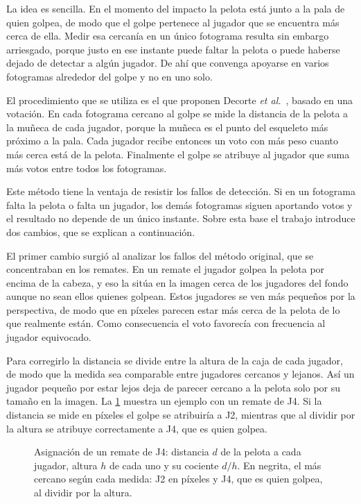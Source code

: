 La idea es sencilla. En el momento del impacto la pelota está junto a la pala de quien golpea, de modo que el golpe pertenece al jugador que se encuentra más cerca de ella.
Medir esa cercanía en un único fotograma resulta sin embargo arriesgado, porque justo en ese instante puede faltar la pelota o puede haberse dejado de detectar a algún jugador.
De ahí que convenga apoyarse en varios fotogramas alrededor del golpe y no en uno solo.

El procedimiento que se utiliza es el que proponen Decorte \textit{et al.}~\cite{decorte2024padel}, basado en una votación.
En cada fotograma cercano al golpe se mide la distancia de la pelota a la muñeca de cada jugador, porque la muñeca es el punto del esqueleto más próximo a la pala.
Cada jugador recibe entonces un voto con más peso cuanto más cerca está de la pelota.
Finalmente el golpe se atribuye al jugador que suma más votos entre todos los fotogramas.

Este método tiene la ventaja de resistir los fallos de detección.
Si en un fotograma falta la pelota o falta un jugador, los demás fotogramas siguen aportando votos y el resultado no depende de un único instante.
Sobre esta base el trabajo introduce dos cambios, que se explican a continuación.

El primer cambio surgió al analizar los fallos del método original, que se concentraban en los remates.
En un remate el jugador golpea la pelota por encima de la cabeza, y eso la sitúa en la imagen cerca de los jugadores del fondo aunque no sean ellos quienes golpean.
Estos jugadores se ven más pequeños por la perspectiva, de modo que en píxeles parecen estar más cerca de la pelota de lo que realmente están.
Como consecuencia el voto favorecía con frecuencia al jugador equivocado.

Para corregirlo la distancia se divide entre la altura de la caja de cada jugador, de modo que la medida sea comparable entre jugadores cercanos y lejanos.
Así un jugador pequeño por estar lejos deja de parecer cercano a la pelota solo por su tamaño en la imagen.
La \cref{fig:asignacion} muestra un ejemplo con un remate de J4.
Si la distancia se mide en píxeles el golpe se atribuiría a J2, mientras que al dividir por la altura se atribuye correctamente a J4, que es quien golpea.

\begin{figure}[htbp]
  \centering
  
   \caption[Asignación de un remate]{Asignación de un remate de J4: distancia $d$ de la pelota a cada jugador, altura $h$ de cada uno y su cociente $d/h$. En negrita, el más cercano según cada medida: J2 en píxeles y J4, que es quien golpea, al dividir por la altura.}
  \label{fig:asignacion}
\end{figure}

